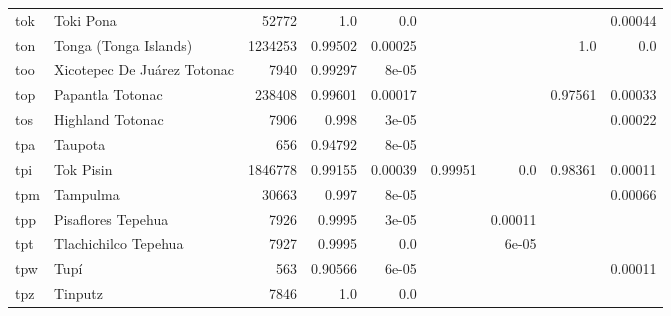 \documentclass[11pt]{article}
\begin{document}
\begin{table*}[h]
{\begin{tabular}{llrrrrrrr}
tok         & Toki Pona         & 52772         & 1.0         & 0.0         &          &          &          & 0.00044         \\

ton         & Tonga (Tonga Islands)         & 1234253         & 0.99502         & 0.00025         &          &          & 1.0         & 0.0         \\

too         & Xicotepec De Juárez Totonac         & 7940         & 0.99297         & 8e-05         &          &          &          &          \\

top         & Papantla Totonac         & 238408         & 0.99601         & 0.00017         &          &          & 0.97561         & 0.00033         \\

tos         & Highland Totonac         & 7906         & 0.998         & 3e-05         &          &          &          & 0.00022         \\

tpa         & Taupota         & 656         & 0.94792         & 8e-05         &          &          &          &          \\

tpi         & Tok Pisin         & 1846778         & 0.99155         & 0.00039         & 0.99951         & 0.0         & 0.98361         & 0.00011         \\

tpm         & Tampulma         & 30663         & 0.997         & 8e-05         &          &          &          & 0.00066         \\

tpp         & Pisaflores Tepehua         & 7926         & 0.9995         & 3e-05         &          & 0.00011         &          &          \\

tpt         & Tlachichilco Tepehua         & 7927         & 0.9995         & 0.0         &          & 6e-05         &          &          \\

tpw         & Tupí         & 563         & 0.90566         & 6e-05         &          &          &          & 0.00011         \\

tpz         & Tinputz         & 7846         & 1.0         & 0.0         &          &          &          &          \\


\end{tabular}}
\end{table*}
\end{document}
